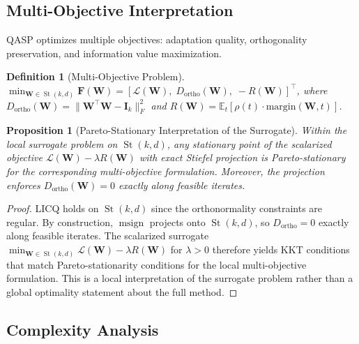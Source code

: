 \documentclass[twocolumn]{article}
\newtheorem{proposition}{Proposition}
\newtheorem{definition}{Definition}
\DeclareMathOperator{\msign}{msign}
\DeclareMathOperator{\St}{St}
\begin{document}
\subsection{Multi-Objective Interpretation}

QASP optimizes multiple objectives: adaptation quality, orthogonality preservation, and information value maximization.

\begin{definition}[Multi-Objective Problem]
$\min_{\mathbf{W} \in \St(k,d)} \mathbf{F}(\mathbf{W}) = [\mathcal{L}(\mathbf{W}),\; D_{\text{ortho}}(\mathbf{W}),\; -R(\mathbf{W})]^\top$,
where $D_{\text{ortho}}(\mathbf{W}) = \|\mathbf{W}^\top \mathbf{W} - \mathbf{I}_k\|_F^2$ and $R(\mathbf{W}) = \mathbb{E}_t[\rho(t) \cdot \text{margin}(\mathbf{W}, t)]$.
\end{definition}

\begin{proposition}[Pareto-Stationary Interpretation of the Surrogate]\label{thm:pareto}
Within the local surrogate problem on $\St(k,d)$, any stationary point of the scalarized objective $\mathcal{L}(\mathbf{W}) - \lambda R(\mathbf{W})$ with exact Stiefel projection is Pareto-stationary for the corresponding multi-objective formulation. Moreover, the projection enforces $D_{\mathrm{ortho}}(\mathbf{W}) = 0$ exactly along feasible iterates.
\end{proposition}

\begin{proof}
LICQ holds on $\St(k,d)$ since the orthonormality constraints are regular. By construction, $\msign$ projects onto $\St(k,d)$, so $D_{\text{ortho}} = 0$ exactly along feasible iterates. The scalarized surrogate $\min_{\mathbf{W} \in \St(k,d)} \mathcal{L}(\mathbf{W}) - \lambda R(\mathbf{W})$ for $\lambda > 0$ therefore yields KKT conditions that match Pareto-stationarity conditions for the local multi-objective formulation. This is a local interpretation of the surrogate problem rather than a global optimality statement about the full method.
\end{proof}

\subsection{Complexity Analysis}
\end{document}
